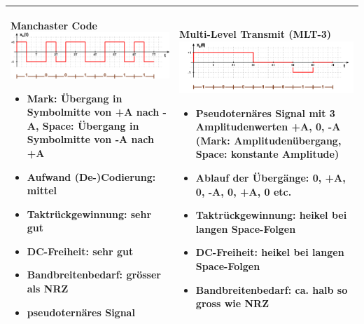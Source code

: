 \begin{longtable}{|p{9cm}|p{9cm}|}
	\textbf{Manchaster Code}\newline
	\includegraphics[width=8cm]{bilder/DigitaleBasisbandSignale/Manchaster.png}\newline
	\begin{itemize}[noitemsep]
		\item \textbf{Mark:} Übergang in Symbolmitte von +A nach -A, \textbf{Space:} Übergang in Symbolmitte von -A nach +A
		\item \textbf{Aufwand (De-)Codierung:} mittel
		\item \textbf{Taktrückgewinnung:} sehr gut
		\item \textbf{DC-Freiheit:} sehr gut
		\item \textbf{Bandbreitenbedarf:} grösser als NRZ
		\item pseudoternäres Signal
	\end{itemize}
	&
	\textbf{Multi-Level Transmit (MLT-3)}\newline
	\includegraphics[width=8cm]{bilder/DigitaleBasisbandSignale/MultiLevelTransmit3.png}\newline
	\begin{itemize}[noitemsep]
		\item Pseudoternäres Signal mit 3 Amplitudenwerten +A, 0, -A (\textbf{Mark:} Amplitudenübergang, \textbf{Space:} konstante Amplitude)
		\item \textbf{Ablauf der Übergänge:} 0, +A, 0, -A, 0, +A, 0 etc.
		\item \textbf{Taktrückgewinnung:} heikel bei langen Space-Folgen
		\item \textbf{DC-Freiheit:} heikel bei langen Space-Folgen
		\item \textbf{Bandbreitenbedarf:} ca. halb so gross wie NRZ
	\end{itemize}\\
	
	\hline
	

\end{longtable}
